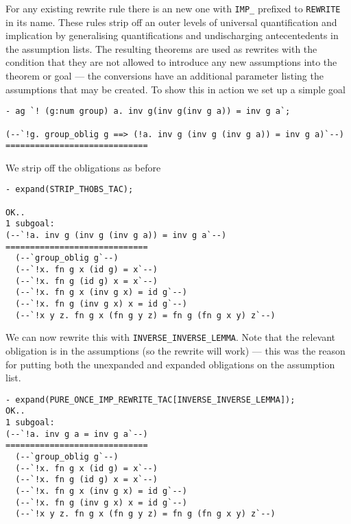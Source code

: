For any existing rewrite rule there is an new one with \verb!IMP_! prefixed
to \verb!REWRITE! in its name. These rules strip off an outer levels of
universal quantification and implication by generalising quantifications
and undischarging antecentedents in the assumption lists. The resulting
theorems are used as rewrites with the condition that they are not
allowed to introduce any new assumptions into the theorem or goal --- the
conversions have an additional parameter listing the assumptions that
may be created. To show this in action we set up a simple goal

\begin{small}
\begin{verbatim}
- ag `! (g:num group) a. inv g(inv g(inv g a)) = inv g a`;

(--`!g. group_oblig g ==> (!a. inv g (inv g (inv g a)) = inv g a)`--)
=============================
\end{verbatim}
\end{small}

We strip off the obligations as before

\begin{small}
\begin{verbatim}
- expand(STRIP_THOBS_TAC);

OK..
1 subgoal:
(--`!a. inv g (inv g (inv g a)) = inv g a`--)
=============================
  (--`group_oblig g`--)
  (--`!x. fn g x (id g) = x`--)
  (--`!x. fn g (id g) x = x`--)
  (--`!x. fn g x (inv g x) = id g`--)
  (--`!x. fn g (inv g x) x = id g`--)
  (--`!x y z. fn g x (fn g y z) = fn g (fn g x y) z`--)
\end{verbatim}
\end{small}

We can now rewrite this with \verb!INVERSE_INVERSE_LEMMA!. Note that
the relevant obligation is in the assumptions (so the rewrite will work)
--- this was the reason for putting both the unexpanded and expanded
obligations on the assumption list.

\begin{small}
\begin{verbatim}
- expand(PURE_ONCE_IMP_REWRITE_TAC[INVERSE_INVERSE_LEMMA]);
OK..
1 subgoal:
(--`!a. inv g a = inv g a`--)
=============================
  (--`group_oblig g`--)
  (--`!x. fn g x (id g) = x`--)
  (--`!x. fn g (id g) x = x`--)
  (--`!x. fn g x (inv g x) = id g`--)
  (--`!x. fn g (inv g x) x = id g`--)
  (--`!x y z. fn g x (fn g y z) = fn g (fn g x y) z`--)
\end{verbatim}
\end{small}

